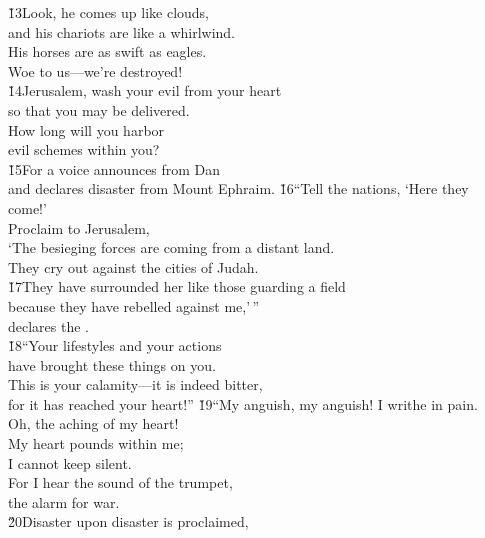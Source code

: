 \begin{poetry}
\poeml \v{13}Look, he comes up like clouds, \\
\poemll    and his chariots are like a whirlwind. \\
\poeml His horses are as swift as eagles. \\
\poemll    Woe to us---we're destroyed! \\
\poeml \v{14}Jerusalem, wash your evil from your heart \\
\poemll    so that you may be delivered. \\
\poeml How long will you harbor \\
\poemll    evil schemes within you? \\
\poeml \v{15}For a voice announces from Dan \\
\poemll    and declares disaster from Mount Ephraim.
\poeml \v{16}``Tell the nations, `Here they come!' \\
\poemll    Proclaim to Jerusalem, \\
\poeml `The besieging forces are coming from a distant land. \\
\poemll    They cry out against the cities of Judah. \\
\poeml \v{17}They have surrounded her like those guarding a field \\
\poemll    because they have rebelled against me,'\,'' \\
\poemlll       declares the . \\
\poeml \v{18}``Your lifestyles and your actions \\
\poemll    have brought these things on you. \\
\poeml This is your calamity---it is indeed bitter, \\
\poemll    for it has reached your heart!''
\poeml \v{19}``My anguish, my anguish! I writhe in pain. \\
\poemll    Oh, the aching of my heart! \\
\poeml My heart pounds within me; \\
\poemll    I cannot keep silent. \\
\poeml For I hear the sound of the trumpet, \\
\poemll    the alarm for war. \\
\poeml \v{20}Disaster upon disaster is proclaimed, \\

\end{poetry}
